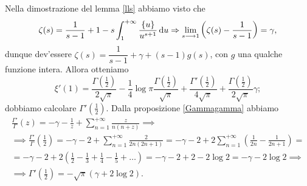 Nella dimostrazione del lemma \ref{lls} abbiamo visto che
$$\zeta(s)=\frac{1}{s-1}+1-s\int_1^{+\infty} \frac{\{u\}}{u^{s+1}}\mathop{}\!\mathrm{d} u \Rightarrow \lim_{s \longrightarrow 1} \left(\zeta(s)-\frac{1}{s-1}\right)=\gamma,$$
dunque dev'essere $\zeta(s)=\dfrac{1}{s-1}+\gamma+(s-1)g(s)$, con $g$ una qualche funzione intera. Allora otteniamo
$$\xi'(1)=\frac{\Gamma\left(\frac{1}{2}\right)}{2\sqrt{\pi}}-\frac{1}{4}\log{\pi}\frac{\Gamma\left(\frac{1}{2}\right)}{\sqrt{\pi}}+\frac{\Gamma'\left(\frac{1}{2}\right)}{4\sqrt{\pi}}+\frac{\Gamma\left(\frac{1}{2}\right)}{2\sqrt{\pi}}\gamma;$$
dobbiamo calcolare $\Gamma'\left(\frac{1}{2}\right)$. Dalla proposizione \ref{Gammagamma} abbiamo
\begin{gather*}
  \frac{\Gamma'}{\Gamma}(z)=-\gamma-\frac{1}{z}+\sum_{n=1}^{+\infty} \frac{z}{n(n+z)} \implies \\
  \implies \frac{\Gamma'}{\Gamma}\left(\frac{1}{2}\right)=-\gamma-2+\sum_{n=1}^{+\infty} \frac{2}{2n(2n+1)}=-\gamma-2+2\sum_{n=1}^{+\infty} \left(\frac{1}{2n}-\frac{1}{2n+1}\right)= \\
  =-\gamma-2+2\left(\frac{1}{2}-\frac{1}{3}+\frac{1}{4}-\frac{1}{5}+\dots\right)=-\gamma-2+2-2\log{2}=-\gamma-2\log{2} \implies \\
  \implies \Gamma'\left(\frac{1}{2}\right)=-\sqrt{\pi}(\gamma+2\log{2}).
\end{gather*}
